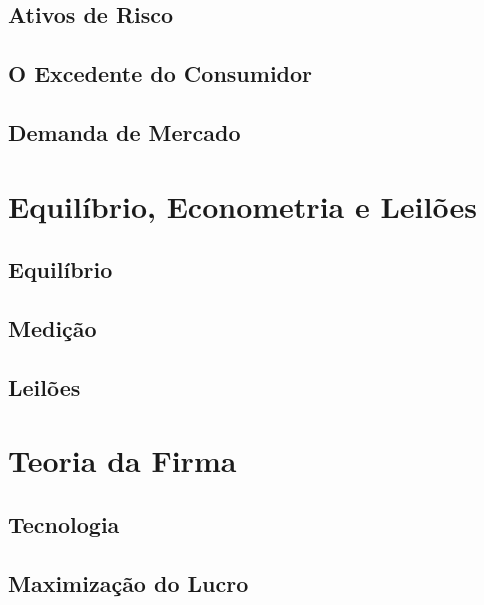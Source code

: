 \documentclass[a4paper,11pt,oneside]{book}
\theoremstyle{definition}
\theoremstyle{break}
\begin{document}
\chapter{Ativos de Risco}

\chapter{O Excedente do Consumidor}

\chapter{Demanda de Mercado}

\part{Equilíbrio, Econometria e Leilões}

\chapter{Equilíbrio}

\chapter{Medição}

\chapter{Leilões}

\part{Teoria da Firma}

\chapter{Tecnologia}

\chapter{Maximização do Lucro}
\end{document}

